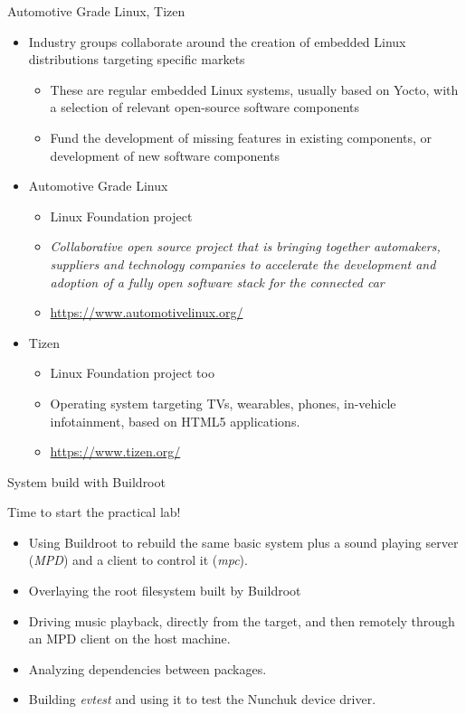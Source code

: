 \begin{frame}{Automotive Grade Linux, Tizen}
  \begin{itemize}
  \item Industry groups collaborate around the creation of embedded
    Linux distributions targeting specific markets
    \begin{itemize}
    \item These are regular embedded Linux systems, usually based on
      Yocto, with a selection of relevant open-source software components
    \item Fund the development of missing features in existing
      components, or development of new software components
    \end{itemize}
  \item Automotive Grade Linux
    \begin{itemize}
    \item Linux Foundation project
    \item {\em Collaborative open source project that is bringing
        together automakers, suppliers and technology companies to
        accelerate the development and adoption of a fully open
        software stack for the connected car}
    \item \url{https://www.automotivelinux.org/}
    \end{itemize}
  \item Tizen
    \begin{itemize}
    \item Linux Foundation project too
    \item Operating system targeting TVs, wearables, phones, in-vehicle
          infotainment, based on HTML5 applications.
    \item \url{https://www.tizen.org/}
    \end{itemize}
  \end{itemize}
\end{frame}

\setuplabframe
{System build with Buildroot}
{
  Time to start the practical lab!
  \begin{itemize}
  \item Using Buildroot to rebuild the same basic system plus a sound
    playing server ({\em MPD}) and a client to control it ({\em mpc}).
  \item Overlaying the root filesystem built by Buildroot
  \item Driving music playback, directly from the target, and then
    remotely through an MPD client on the host machine.
  \item Analyzing dependencies between packages.
  \item Building {\em evtest} and using it to test the Nunchuk
        device driver.
  \end{itemize}
}
